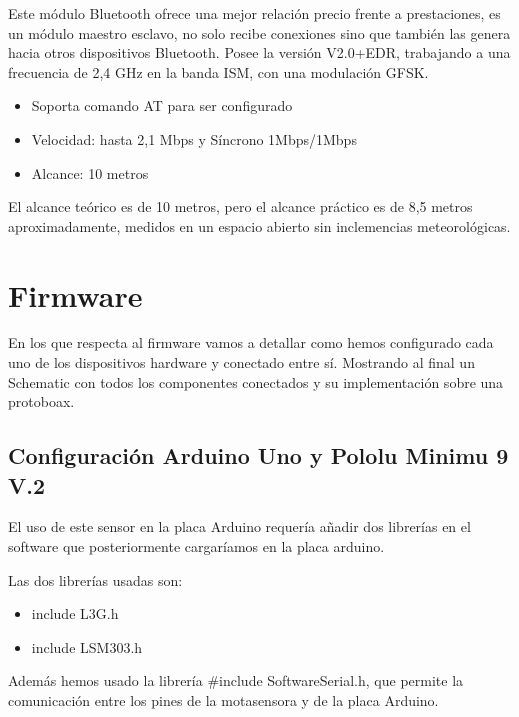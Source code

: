 			Este m\'odulo Bluetooth \cite{HC05} ofrece una mejor relaci\'on precio frente a prestaciones, es un m\'odulo maestro esclavo, no solo recibe conexiones sino que tambi\'en las genera hacia otros dispositivos Bluetooth. Posee la versi\'on V2.0+EDR, trabajando a una frecuencia de 2,4 GHz en la banda ISM, con una modulaci\'on GFSK.
			
			\begin{itemize}
				\item Soporta comando AT para ser configurado
				\item Velocidad: hasta 2,1 Mbps y S\'incrono 1Mbps/1Mbps
				\item Alcance: 10 metros 
			\end{itemize}
			
			El alcance te\'orico es de 10 metros, pero el alcance pr\'actico es de 8,5 metros aproximadamente, medidos en un espacio abierto sin inclemencias meteorol\'ogicas.

			
		
	\section{Firmware}
	
		En los que respecta al firmware vamos a detallar como hemos configurado cada uno de los dispositivos hardware y conectado entre s\'i. Mostrando al final un Schematic con todos los componentes conectados y su implementaci\'on sobre una protoboax.
		
		\subsection{Configuraci\'on Arduino Uno y Pololu Minimu 9 V.2}
		
			El uso de este sensor en la placa Arduino requer\'ia a\~nadir dos librer\'ias en el software que posteriormente cargar\'iamos en la placa arduino.
			
			Las dos librer\'ias usadas son:
			
			\begin{itemize}	
				
				\item include L3G.h
				
				\item include LSM303.h
				
			\end{itemize}
			
			
			Adem\'as hemos usado la librer\'ia \#include SoftwareSerial.h, que permite la comunicaci\'on entre los pines de la motasensora y de la placa Arduino.
			
